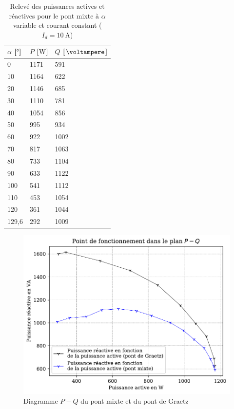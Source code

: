 \documentclass[a4paper, 11pt, openany, oneside, french]{article}
\begin{document}
\begin{table}[!ht]
\centering
\begin{tabular}{lll}
\toprule
$\alpha$ [$\si{\degree}$] & $P$ [$\si{\watt}$] & $Q$ [$\si{\voltampere}$] \\ \midrule
0                         & 1171               & 591                      \\
10                        & 1164               & 622                      \\
20                        & 1146               & 685                      \\
30                        & 1110               & 781                      \\
40                        & 1054               & 856                      \\
50                        & 995                & 934                      \\
60                        & 922                & 1002                     \\
70                        & 817                & 1063                     \\
80                        & 733                & 1104                     \\
90                        & 633                & 1122                     \\
100                       & 541                & 1112                     \\
110                       & 453                & 1054                     \\
120                       & 361                & 1044                     \\
129,6                     & 292                & 1009                     \\ \bottomrule
\end{tabular}
\caption{Relevé des puissances actives et réactives pour le pont mixte à $\alpha$ variable et courant constant ($I_d=\SI{10}{\ampere}$)\label{tab:power_mixte}}
\end{table}

\clearpage

\begin{figure}[!ht]
    \centering
    \includegraphics[width=0.8\linewidth]{cercle_PQ_complet}
    \caption{Diagramme $P-Q$ du pont mixte et du pont de Graetz}
    \label{fig:circle}
\end{figure}
\end{document}

